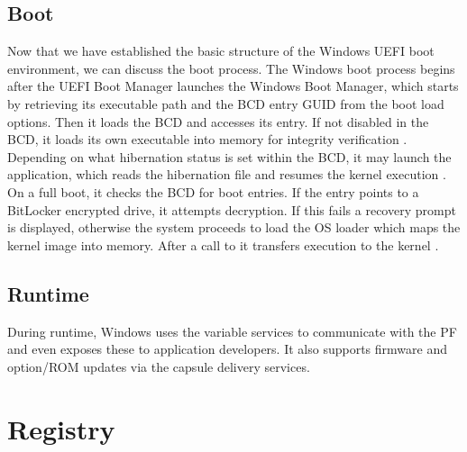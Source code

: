 \subsection{Boot}

Now that we have established the basic structure of the Windows \ac{UEFI} boot environment, we can discuss the boot process.
The Windows boot process begins after the \ac{UEFI} Boot Manager launches the Windows Boot Manager, which starts by retrieving its executable path and the \ac{BCD} entry \ac{GUID} from the boot load options.
Then it loads the \ac{BCD} and accesses its entry.
If not disabled in the \ac{BCD}, it loads its own executable into memory for integrity verification \cite[Section 12]{windows-internals-7-part2}.
Depending on what hibernation status is set within the \ac{BCD}, it may launch the  application, which reads the hibernation file and resumes the kernel execution \cite[Section 12]{windows-internals-7-part2}.
On a full boot, it checks the \ac{BCD} for boot entries.
If the entry points to a BitLocker encrypted drive, it attempts decryption.
If this fails a recovery prompt is displayed, otherwise the system proceeds to load the \ac{OS} loader  which maps the kernel image  into memory. After a call to  it transfers execution to the kernel \cite[Section 12]{windows-internals-7-part2}.

\subsection{Runtime}

During runtime, Windows uses the variable services to communicate with the \ac{PF} and even exposes these to application developers.
It also supports firmware and option\-/\ac{ROM} updates via the capsule delivery services.

\section{Registry}

